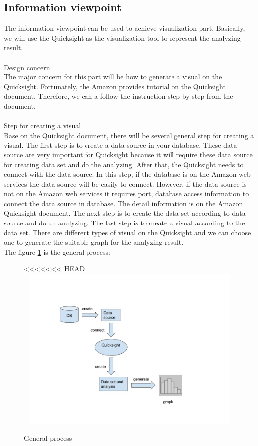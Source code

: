     \subsection{Information viewpoint}
    The information viewpoint can be used to achieve visualization part. Basically, we will use the Quicksight as the visualization tool to represent the analyzing result.\\
\\
    Design concern \\
    The major concern for this part will be how to generate a visual on the Quicksight. Fortunately, the Amazon provides tutorial on the Quicksight document. Therefore, we can a follow the instruction step by step from the document.\\
\\    
    Step for creating a visual\\
    Base on the Quicksight document, there will be several general step for creating a visual. The first step is to create a data source in your database. These data source are very important for Quicksight because it will require these data source for creating data set and do the analyzing. After that, the Quicksight needs to connect with the data source. In this step, if the database is on the Amazon web services the data source will be easily to connect. However, if the data source is not on the Amazon web services it requires port, database access information to connect the data source in database. The detail information is on the Amazon Quicksight document. The next step is to create the data set according to data source and do an analyzing. The last step is to create a visual according to the data set. There are different types of visual on the Quicksight and we can choose one to generate the suitable graph for the analyzing result.\cite{w4}\\
The figure \ref{fig:2} is the general process:
    \begin{figure}[h]
<<<<<<< HEAD
    \includegraphics[width=16cm, height=8cm]{4.jpg}
    \centering
    \caption{\label{fig:2}General process}
    \end{figure}

